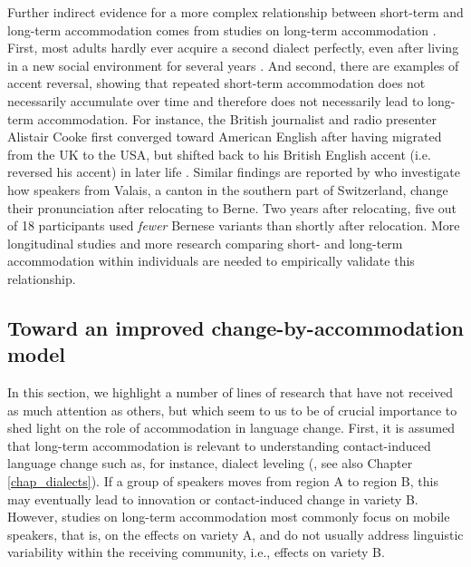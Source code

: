 \documentclass[output=paper]{langscibook}
\begin{document}
Further indirect evidence for a more complex relationship between short-term and long-term accommodation comes from studies on long-term accommodation \citep[see][]{ruch_function_2018}. First, most adults hardly ever acquire a second dialect perfectly, even after living in a new social environment for several years \citep{siegel_second_2010}. And second, there are examples of accent reversal, showing that repeated short-term accommodation does not necessarily accumulate over time and therefore does not necessarily lead to long-term accommodation. For instance, the British journalist and radio presenter Alistair Cooke  first converged toward American English after having migrated from the UK to the USA, but shifted back to his British English accent (i.e. reversed his accent) in later life \citep{reubold_dissociating_2015}.  Similar findings are reported by \textcite{werlen_zwischen_2006} who investigate how speakers from Valais, a canton in the southern part of Switzerland, change their pronunciation after relocating to Berne. Two years after relocating, five out of 18 participants used \textit{fewer} Bernese variants than shortly after relocation. More longitudinal studies and more research comparing short- and long-term accommodation within individuals are needed to empirically validate this relationship.

\subsection{Toward an improved change-by-accommodation model}

In this section, we highlight a number of lines of research that have not received as much attention as others, but which seem to us to be of crucial importance to shed light on the role of accommodation in language change. First, it is assumed that long-term accommodation is relevant to understanding contact-induced language change such as, for instance, dialect leveling (\cite{trudgill_dialects_1986}, see also Chapter \ref{chap_dialects}). If a group of speakers moves from region A to region B, this may eventually lead to innovation or contact-induced change in variety B. However, studies on long-term accommodation most commonly focus on mobile speakers, that is, on the effects on variety A, and do not usually address linguistic variability within the receiving community, i.e., effects on variety B.
\end{document}
